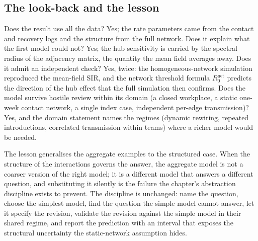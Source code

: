 \subsection{The look-back and the lesson}

Does the result use all the data? Yes; the rate parameters came from the
contact and recovery logs and the structure from the full network. Does it
explain what the first model could not? Yes; the hub sensitivity is carried
by the spectral radius of the adjacency matrix, the quantity the mean field
averages away. Does it admit an independent check? Yes, twice: the
homogeneous-network simulation reproduced the mean-field SIR, and the
network threshold formula $R_0^{\text{net}}$ predicts the direction of the
hub effect that the full simulation then confirms. Does the model survive
hostile review within its domain (a closed workplace, a static one-week
contact network, a single index case, independent per-edge transmission)?
Yes, and the domain statement names the regimes (dynamic rewiring, repeated
introductions, correlated transmission within teams) where a richer model
would be needed.

The lesson generalises the aggregate examples to the structured case. When
the structure of the interactions governs the answer, the aggregate model
is not a coarser version of the right model; it is a different model that
answers a different question, and substituting it silently is the failure
the chapter's abstraction discipline exists to prevent. The discipline is
unchanged: name the question, choose the simplest model, find the question
the simple model cannot answer, let it specify the revision, validate the
revision against the simple model in their shared regime, and report the
prediction with an interval that exposes the structural uncertainty the
static-network assumption hides.

